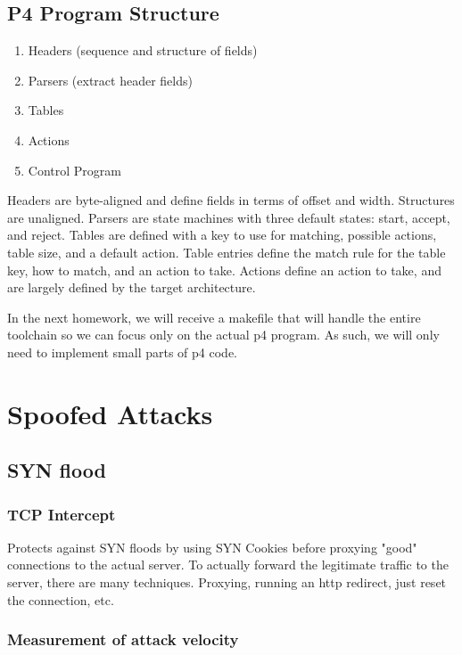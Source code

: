 \documentclass{idc_msc}
\begin{document}
\subsection{P4 Program Structure}

\begin{enumerate}
  \item Headers (sequence and structure of fields)
  \item Parsers (extract header fields)
  \item Tables
  \item Actions
  \item Control Program
\end{enumerate}

Headers are byte-aligned and define fields in terms of offset and width.
Structures are unaligned.
Parsers are state machines with three default states: start, accept, and reject.
Tables are defined with a key to use for matching, possible actions, table size, and a default action.
Table entries define the match rule for the table key, how to match, and an action to take.
Actions define an action to take, and are largely defined by the target architecture.

In the next homework, we will receive a makefile that will handle the entire toolchain so we can focus only on the actual p4 program.
As such, we will only need to implement small parts of p4 code.

\section{Spoofed Attacks}

\subsection{SYN flood}

\subsubsection{TCP Intercept}

Protects against SYN floods by using SYN Cookies before proxying "good" connections to the actual server.
To actually forward the legitimate traffic to the server, there are many techniques.
Proxying, running an http redirect, just reset the connection, etc.

\subsubsection{Measurement of attack velocity}
\end{document}
